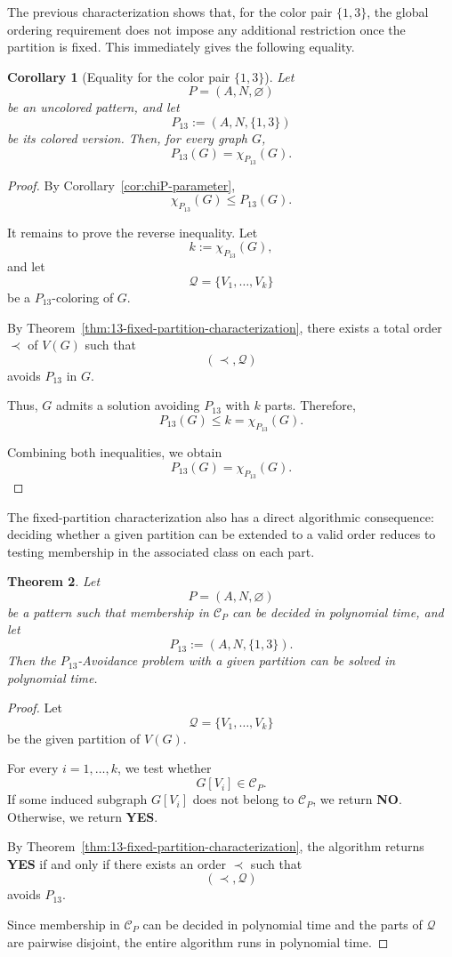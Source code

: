\documentclass[12pt]{article}
\theoremstyle{plain}
\newtheorem{theorem}{Theorem}[section]
\newtheorem{corollary}[theorem]{Corollary}
\theoremstyle{definition}
\theoremstyle{remark}
\theoremstyle{definition}
\begin{document}
The previous characterization shows that, for the color pair
\(\{1,3\}\), the global ordering requirement does not impose any additional
restriction once the partition is fixed. This immediately gives the following
equality.



\begin{corollary}[Equality for the color pair \(\{1,3\}\)]
\label{cor:13-colored-partition-equality}
Let
\[
P=(A,N,\varnothing)
\]
be an uncolored pattern, and let
\[
P_{13}:=(A,N,\{1,3\})
\]
be its colored version. Then, for every graph \(G\),
\[
P_{13}(G)=\chi_{P_{13}}(G).
\]
\end{corollary}

\begin{proof}
By Corollary~\ref{cor:chiP-parameter},
\[
\chi_{P_{13}}(G)\le P_{13}(G).
\]

It remains to prove the reverse inequality. Let
\[
k:=\chi_{P_{13}}(G),
\]
and let
\[
\mathcal Q=\{V_1,\dots,V_k\}
\]
be a \(P_{13}\)-coloring of \(G\).

By Theorem~\ref{thm:13-fixed-partition-characterization}, there exists a total
order \(\prec\) of \(V(G)\) such that
\[
(\prec,\mathcal Q)
\]
avoids \(P_{13}\) in \(G\).

Thus, \(G\) admits a solution avoiding \(P_{13}\) with \(k\) parts. Therefore,
\[
P_{13}(G)
\le k
=
\chi_{P_{13}}(G).
\]

Combining both inequalities, we obtain
\[
P_{13}(G)
=
\chi_{P_{13}}(G).
\]
\end{proof}




The fixed-partition characterization also has a direct algorithmic
consequence: deciding whether a given partition can be extended to a valid
order reduces to testing membership in the associated class on each part.




\begin{theorem}\label{thm:13-given-partition-polynomial}
Let
\[
P=(A,N,\varnothing)
\]
be a pattern such that membership in \(\mathcal C_P\) can be decided in polynomial time, and let
\[
P_{13}:=(A,N,\{1,3\}).
\]
Then the \(P_{13}\)-Avoidance problem with a given partition can be solved in polynomial time.
\end{theorem}

\begin{proof}
Let
\[
\mathcal Q=\{V_1,\dots,V_k\}
\]
be the given partition of \(V(G)\).

For every \(i=1,\dots,k\), we test whether
\[
G[V_i]\in\mathcal C_P.
\]
If some induced subgraph \(G[V_i]\) does not belong to \(\mathcal C_P\), we return \textbf{NO}. Otherwise, we return
\textbf{YES}.

By Theorem~\ref{thm:13-fixed-partition-characterization}, the algorithm returns \textbf{YES} if and only if there
exists an order \(\prec\) such that
\[
(\prec,\mathcal Q)
\]
avoids \(P_{13}\).

Since membership in \(\mathcal C_P\) can be decided in polynomial time and the parts of \(\mathcal Q\) are pairwise
disjoint, the entire algorithm runs in polynomial time.
\end{proof}
\end{document}
